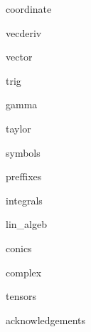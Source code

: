 \documentclass[8pt,a4paper,fleqn]{extarticle} %
\begin{document}
\begin{multicols}{3}
\raggedright %

{coordinate}

 {vecderiv}

 {vector}

 {trig}

{gamma}

{taylor}

{symbols}

{preffixes}

{integrals}

{lin_algeb}

{conics}

{complex}


{tensors}

{acknowledgements}


\end{multicols}
\end{document}
